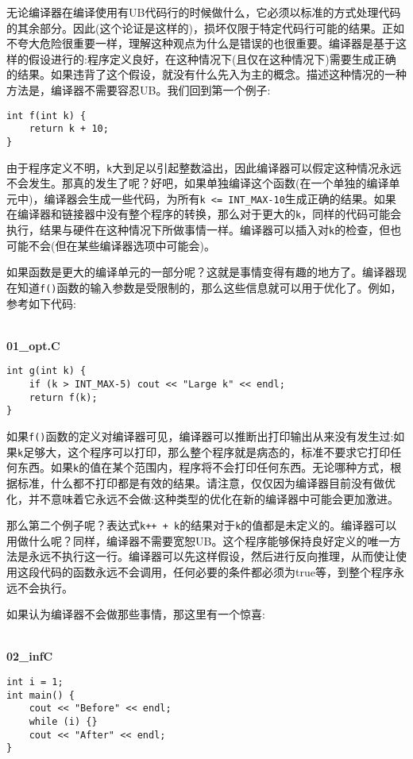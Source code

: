 无论编译器在编译使用有UB代码行的时候做什么，它必须以标准的方式处理代码的其余部分。因此(这个论证是这样的)，损坏仅限于特定代码行可能的结果。正如不夸大危险很重要一样，理解这种观点为什么是错误的也很重要。编译器是基于这样的假设进行的:程序定义良好，在这种情况下(且仅在这种情况下)需要生成正确的结果。如果违背了这个假设，就没有什么先入为主的概念。描述这种情况的一种方法是，编译器不需要容忍UB。我们回到第一个例子:

\begin{lstlisting}[style=styleCXX]
int f(int k) {
	return k + 10;
}
\end{lstlisting}

由于程序定义不明，\texttt{k}大到足以引起整数溢出，因此编译器可以假定这种情况永远不会发生。那真的发生了呢？好吧，如果单独编译这个函数(在一个单独的编译单元中)，编译器会生成一些代码，为所有\texttt{k <= INT\_MAX-10}生成正确的结果。如果在编译器和链接器中没有整个程序的转换，那么对于更大的\texttt{k}，同样的代码可能会执行，结果与硬件在这种情况下所做事情一样。编译器可以插入对\texttt{k}的检查，但也可能不会(但在某些编译器选项中可能会)。

如果函数是更大的编译单元的一部分呢？这就是事情变得有趣的地方了。编译器现在知道\texttt{f()}函数的输入参数是受限制的，那么这些信息就可以用于优化了。例如，参考如下代码:

\hspace*{\fill} \\ %
\noindent
\textbf{01\_opt.C}
\begin{lstlisting}[style=styleCXX]
int g(int k) {
	if (k > INT_MAX-5) cout << "Large k" << endl;
	return f(k);
}
\end{lstlisting}

如果\texttt{f()}函数的定义对编译器可见，编译器可以推断出打印输出从来没有发生过:如果\texttt{k}足够大，这个程序可以打印，那么整个程序就是病态的，标准不要求它打印任何东西。如果\texttt{k}的值在某个范围内，程序将不会打印任何东西。无论哪种方式，根据标准，什么都不打印都是有效的结果。请注意，仅仅因为编译器目前没有做优化，并不意味着它永远不会做:这种类型的优化在新的编译器中可能会更加激进。

那么第二个例子呢？表达式\texttt{k++ + k}的结果对于\texttt{k}的值都是未定义的。编译器可以用做什么呢？同样，编译器不需要宽恕UB。这个程序能够保持良好定义的唯一方法是永远不执行这一行。编译器可以先这样假设，然后进行反向推理，从而使让使用这段代码的函数永远不会调用，任何必要的条件都必须为true等，到整个程序永远不会执行。

如果认为编译器不会做那些事情，那这里有一个惊喜:

\hspace*{\fill} \\ %
\noindent
\textbf{02\_infC}
\begin{lstlisting}[style=styleCXX]
int i = 1;
int main() {
	cout << "Before" << endl;
	while (i) {}
	cout << "After" << endl;
}
\end{lstlisting}

